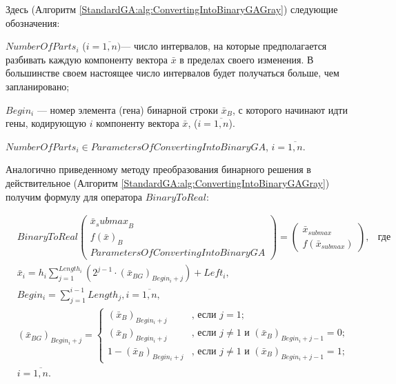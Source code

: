 Здесь (Алгоритм \ref{StandardGA:alg:ConvertingIntoBinaryGAGray}) следующие обозначения:

$NumberOfParts_i  $ ($ i=\overline{1,n}) $--- число интервалов, на которые предполагается разбивать каждую компоненту вектора $ \bar{x}$ в пределах своего изменения. В большинстве своем настоящее число интервалов будет получаться больше, чем запланировано;

$ Begin_i $ --- номер элемента (гена) бинарной строки $ \bar{x}_B $, с которого начинают идти гены, кодирующую $ i $ компоненту вектора $ \bar{x} $, ($ i=\overline{1,n} $).

$NumberOfParts_i \in ParametersOfConvertingIntoBinaryGA $, $i=\overline{1,n}$.

Аналогично приведенному методу преобразования бинарного решения в действительное (Алгоритм \ref{StandardGA:alg:ConvertingIntoBinaryGAGray}) получим формулу для оператора $ BinaryToReal $:

\begin{align}
\label{StandardGA:eq:BinaryToRealGray}
&BinaryToReal\left( \begin{array}{c}\bar{x}{{}_submax}_B \\f\left(\bar{x} \right)_B \\ParametersOfConvertingIntoBinaryGA
\end{array}\right) =\left( \begin{array}{c}\bar{x}_{submax} \\f\left(\bar{x}_{submax} \right)
\end{array}\right),&\text{где } \\
&\bar{x}_i=h_i \sum_{j=1}^{Length_i} \left( 2^{j-1}\cdot {\left( \bar{x}_{BG}\right) }_{Begin_i+j} \right)+Left_i,\nonumber \\
& Begin_i =\sum_{j=1}^{i-1}Length_j, i=\overline{1,n},\nonumber\\
& {\left( \bar{x}_{BG}\right) }_{Begin_i+j} = \left\lbrace \begin{aligned}
{\left( \bar{x}_{B}\right) }_{Begin_i+j}&\text{, если } j=1; \\ {\left( \bar{x}_{B}\right) }_{Begin_i+j}&\text{, если } j\neq 1 \text{ и } {\left( \bar{x}_{B}\right) }_{Begin_i+j-1}=0; \\1-{\left( \bar{x}_{B}\right) }_{Begin_i+j}&\text{, если } j\neq 1 \text{ и } {\left( \bar{x}_{B}\right) }_{Begin_i+j-1}=1; 
\end{aligned}\right.\nonumber\\
& i=\overline{1,n}.\nonumber
\end{align}

\clearpage
